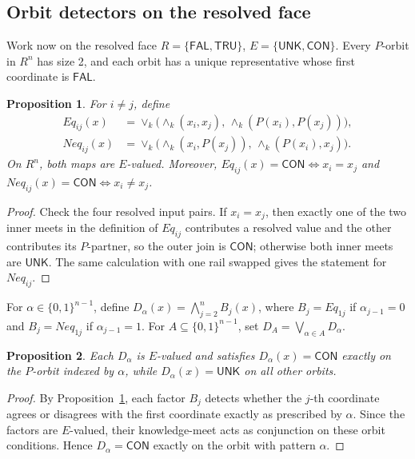 \documentclass[11pt]{article}
\newtheorem{proposition}{Proposition}
\theoremstyle{remark}
\newcommand{\UNK}{\ensuremath{\mathsf{UNK}}}
\newcommand{\FAL}{\ensuremath{\mathsf{FAL}}}
\newcommand{\TRU}{\ensuremath{\mathsf{TRU}}}
\newcommand{\CON}{\ensuremath{\mathsf{CON}}}
\newcommand{\meetk}{\ensuremath{\wedge_k}}
\newcommand{\joink}{\ensuremath{\vee_k}}
\begin{document}
\subsection{Orbit detectors on the resolved face}

Work now on the resolved face $R=\{\FAL,\TRU\}$, $E=\{\UNK,\CON\}$. Every
$P$-orbit in $R^n$ has size 2, and each orbit has a unique representative
whose first coordinate is $\FAL$.

\begin{proposition}\label{prop:A1}
For $i\ne j$, define
\begin{align*}
Eq_{ij}(x)&=\joink\bigl(\meetk(x_i,x_j),\,\meetk(P(x_i),P(x_j))\bigr),\\
Neq_{ij}(x)&=\joink\bigl(\meetk(x_i,P(x_j)),\,\meetk(P(x_i),x_j)\bigr).
\end{align*}
On $R^n$, both maps are $E$-valued. Moreover, $Eq_{ij}(x)=\CON\iff
x_i=x_j$ and $Neq_{ij}(x)=\CON\iff x_i\ne x_j$.
\end{proposition}

\begin{proof}
Check the four resolved input pairs. If $x_i=x_j$, then exactly one of the
two inner meets in the definition of $Eq_{ij}$ contributes a resolved value
and the other contributes its $P$-partner, so the outer join is $\CON$;
otherwise both inner meets are $\UNK$. The same calculation with one rail
swapped gives the statement for $Neq_{ij}$.
\end{proof}

For $\alpha\in\{0,1\}^{n-1}$, define
$D_\alpha(x)=\bigwedge_{j=2}^{n}B_j(x)$, where $B_j=Eq_{1j}$ if
$\alpha_{j-1}=0$ and $B_j=Neq_{1j}$ if $\alpha_{j-1}=1$. For
$A\subseteq\{0,1\}^{n-1}$, set $D_A=\bigvee_{\alpha\in A}D_\alpha$.

\begin{proposition}
Each $D_\alpha$ is $E$-valued and satisfies $D_\alpha(x)=\CON$ exactly on
the $P$-orbit indexed by $\alpha$, while $D_\alpha(x)=\UNK$ on all other
orbits.
\end{proposition}

\begin{proof}
By Proposition~\ref{prop:A1}, each factor $B_j$ detects whether the $j$-th
coordinate agrees or disagrees with the first coordinate exactly as
prescribed by $\alpha$. Since the factors are $E$-valued, their
knowledge-meet acts as conjunction on these orbit conditions. Hence
$D_\alpha=\CON$ exactly on the orbit with pattern $\alpha$.
\end{proof}
\end{document}
